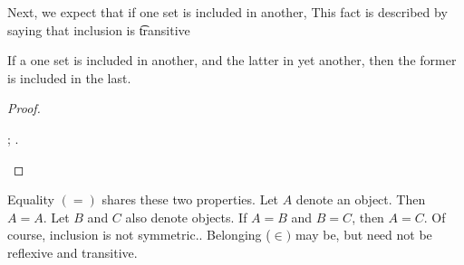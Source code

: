 Next, we expect that if one set is included in another,
This fact is described by saying that inclusion is \t{transitive}
\begin{proposition}[Transitive]
  If a one set is included in another, and the latter in yet another, then the former is included in the last.
\end{proposition}
\begin{proof}
\begin{caccount}
  ;
  .
\end{caccount}
\end{proof}

Equality $(=)$ shares these two properties.
Let $A$ denote an object.
Then $A = A$.
Let $B$ and $C$ also denote objects.
If $A = B$ and $B = C$, then $A = C$.
Of course, inclusion is not symmetric..
Belonging ($\in)$ may be, but need not be reflexive and transitive.


%
